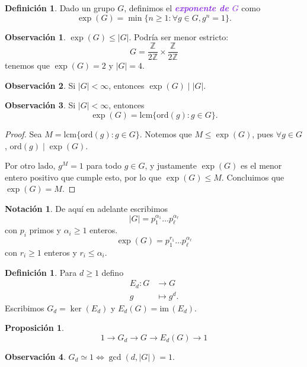\documentclass{article}
\newtheorem{proposition}[theorem]{Proposición}
\theoremstyle{definition}
\newtheorem{definition}[theorem]{Definición}
\newtheorem*{notation}{Notación}
\newtheorem*{obs}{Observación}
\theoremstyle{remark}
\numberwithin{equation}{section}
\newcommand{\Z}{\mathbb{Z}}
\renewcommand{\a}{\alpha}
\newcommand{\oo}{\infty}
\newcommand{\im}{\mathrm{im}\,}
\newcommand{\ord}{\mathrm{ord}}
\newcommand{\lcm}{\mathrm{lcm}}
\newcommand{\abs}[1]{\left| #1 \right|}
\newcommand{\znz}[1]{\frac{\Z}{#1 \Z}}
\newcommand{\wea}[1]{\textcolor{BlueViolet}{\textbf{\emph{#1}}}}
\begin{document}
\begin{definition}
  Dado un grupo $G$, definimos el \wea{exponente de $G$} como
  \[\exp(G) = \min\{n \geq 1 : \forall g \in G, g^n = 1\}.\]
\end{definition}

\begin{obs}
  $\exp(G) \leq \abs G$. Podría ser menor estricto:
  \[G = \znz2 \times \znz2\]
  tenemos que $\exp(G) = 2$ y $\abs G = 4$.
\end{obs}

\begin{obs}
  Si $\abs G < \oo$, entonces $\exp(G) \mid \abs G$.
\end{obs}

\newpage %
\begin{obs}
  Si $\abs G < \oo$, entonces
  \[\exp(G) = \lcm\{\ord(g) : g \in G\}.\]
\end{obs}
\begin{proof}
  Sea $M = \lcm\{\ord(g) : g \in G\}$. Notemos que $M \leq \exp(G)$, pues $\forall g \in G$, $\ord(g) \mid \exp(G)$.

  Por otro lado, $g^M = 1$ para todo $g \in G$, y justamente $\exp(G)$ es el menor entero positivo que cumple esto, por lo que $\exp(G) \leq M$. Concluimos que $\exp(G) = M$.
\end{proof}

\begin{notation}
  De aquí en adelante escribimos
  \[\abs G = p_1^{\a_1} \dots p_\ell^{\a_\ell}\]
  con $p_i$ primos y $\a_i \geq 1$ enteros.
  \[\exp(G) = p_1^{r_1} \dots p_\ell^{\a_\ell}\]
  con $r_i \geq 1$ enteros y $r_i \leq \a_i$.
\end{notation}

\begin{definition}
  Para $d \geq 1$ defino
  \begin{align*}
    E_d \colon G &\to G \\
    g &\mapsto g^d.
  \end{align*}
  Escribimos $G_d = \ker(E_d)$ y $E_d(G) = \im(E_d)$.
\end{definition}

\begin{proposition}
  \[1 \to G_d \to G \to E_d(G) \to 1\]
\end{proposition}

\begin{obs}
  $G_d \simeq 1 \iff \gcd(d,\abs G) = 1$.
\end{obs}
\end{document}
